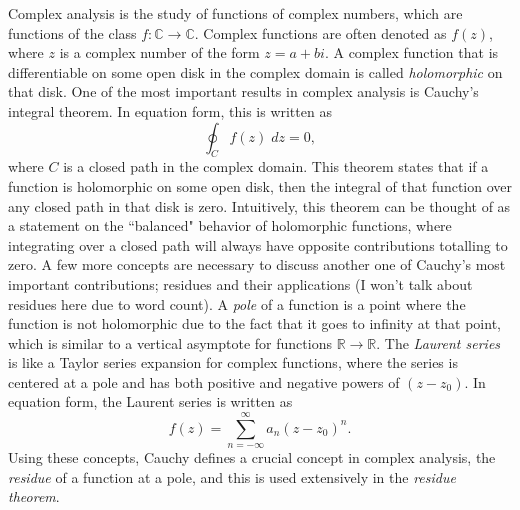 \documentclass{article}
\begin{document}
\newpage

Complex analysis is the study of functions of complex numbers, which are functions of the class $f: \mathbb{C} \to \mathbb{C}$.
Complex functions are often denoted as $f(z)$, where $z$ is a complex number of the form $z = a + bi$.
A complex function that is differentiable on some open disk in the complex domain is called \textit{holomorphic} on that disk.
One of the most important results in complex analysis is Cauchy's integral theorem. 
In equation form, this is written as $$ \oint_C f(z) \; dz = 0, $$ where $C$ is a closed path in the complex domain.
This theorem states that if a function is holomorphic on some open disk, then the integral of that function over any closed path in that disk is zero. 
Intuitively, this theorem can be thought of as a statement on the ``balanced" behavior of holomorphic functions, 
where integrating over a closed path will always have opposite contributions totalling to zero. 
A few more concepts are necessary to discuss another one of Cauchy's most important contributions; residues and their applications (I won't talk about residues here due to word count).
A \textit{pole} of a function is a point where the function is not holomorphic due to the fact that it goes to infinity at that point, 
which is similar to a vertical asymptote for functions $\mathbb{R} \to \mathbb{R}$.
The \textit{Laurent series} is like a Taylor series expansion for complex functions, 
where the series is centered at a pole and has both positive and negative powers of $(z - z_0)$. 
In equation form, the Laurent series is written as $$ f(z) = \sum_{n = -\infty}^{\infty} a_n (z - z_0)^n. $$
Using these concepts, Cauchy defines a crucial concept in complex analysis, the \textit{residue} of a function at a pole, 
and this is used extensively in the \textit{residue theorem}.

\newpage
\end{document}
